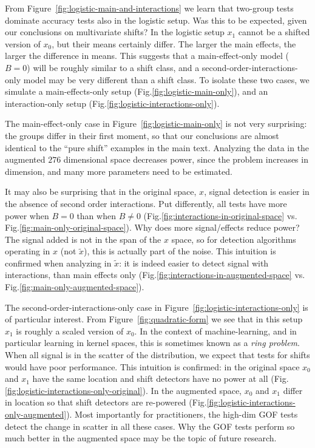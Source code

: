 \documentclass[]{bio}
\begin{document}
From Figure~\ref{fig:logistic-main-and-interactions} we learn that two-group tests dominate accuracy tests also in the logistic setup.
Was this to be expected, given our conclusions on multivariate shifts?
In the logistic setup $x_1$ cannot be a shifted version of $x_0$, but their means certainly differ. 
The larger the main effects, the larger the difference in means.
This suggests that a main-effect-only model ($B=0$) will be roughly similar to a shift class, and a second-order-interactions-only model may be very different than a shift class.
To isolate these two cases, we simulate a main-effects-only setup (Fig.\ref{fig:logistic-main-only}), and an interaction-only setup (Fig.\ref{fig:logistic-interactions-only}).


The main-effect-only case in Figure~\ref{fig:logistic-main-only} is not very surprising: 
the groups differ in their first moment, so that our conclusions are almost identical to the ``pure shift'' examples in the main text.
Analyzing the data in the augmented $276$ dimensional space decreases power, since the problem increases in dimension, and many more parameters need to be estimated. 

It may also be surprising that in the original space, $x$, signal detection is easier in the absence of second order interactions. 
Put differently, all tests have more power when $B=0$ than when $B \neq 0$ (Fig.\ref{fig:interactions-in-original-space} vs. Fig.\ref{fig:main-only-original-space}). 
Why does more signal/effects reduce power? 
The signal added is not in the span of the $x$ space, so for detection algorithms operating in $x$ (not $\tilde{x}$), this is actually part of the noise. 
This intuition is confirmed when analyzing in $\tilde x$: it is indeed easier to detect signal with interactions, than main effects only (Fig.\ref{fig:interactions-in-augmented-space} vs. Fig.\ref{fig:main-only-augmented-space}).

The second-order-interactions-only case in Figure~\ref{fig:logistic-interactions-only} is of particular interest. 
From Figure~\ref{fig:quadratic-form} we see that in this setup $x_1$ is roughly a scaled version of $x_0$.
In the context of machine-learning, and in particular learning in kernel spaces, this is sometimes known as a \emph{ring problem}.
When all signal is in the scatter of the distribution, we expect that tests for shifts would have poor performance. 
This intuition is confirmed: in the original space $x_0$ and $x_1$ have the same location and shift detectors have no power at all (Fig.\ref{fig:logistic-interactions-only-original}). 
In the augmented space, $x_0$ and $x_1$ differ in location so that shift detectors are re-powered (Fig.\ref{fig:logistic-interactions-only-augmented}). 
Most importantly for practitioners, the high-dim GOF tests detect the change in scatter in all these cases. 
Why the GOF tests perform so much better in the augmented space may be the topic of future research.
\end{document}
